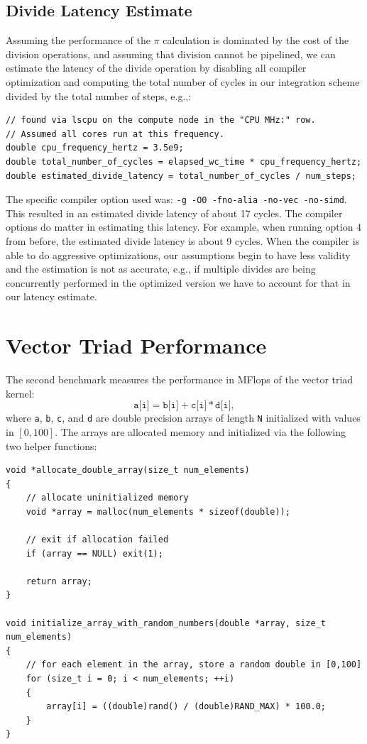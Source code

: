 \documentclass{article}
\begin{document}
\subsection*{Divide Latency Estimate}
Assuming the performance of the $\pi$ calculation is dominated by the cost of the division operations, 
and assuming that division cannot be pipelined, we can estimate the latency of the divide operation by disabling 
all compiler optimization and computing the total number of cycles in our integration scheme divided by the total number of 
steps, e.g.,: 
\begin{lstlisting}
// found via lscpu on the compute node in the "CPU MHz:" row. 
// Assumed all cores run at this frequency.
double cpu_frequency_hertz = 3.5e9;
double total_number_of_cycles = elapsed_wc_time * cpu_frequency_hertz;
double estimated_divide_latency = total_number_of_cycles / num_steps;
\end{lstlisting}
The specific compiler option used was: \texttt{-g -O0 -fno-alia -no-vec -no-simd}. This 
resulted in an estimated divide latency of about 17 cycles. The compiler options do matter in estimating this latency. 
For example, when running option 4 from before, the estimated divide latency is about 9 cycles. When the compiler 
is able to do aggressive optimizations, our assumptions begin to have less validity and the estimation is not as accurate, e.g., 
if multiple divides are being concurrently performed in the optimized version we have to account for that in our latency estimate.


\section{Vector Triad Performance}
The second benchmark measures the performance in MFlops of the vector triad kernel: 
$$
\texttt{a[i]} = \texttt{b[i]} + \texttt{c[i]} * \texttt{d[i]},
$$
where \texttt{a}, \texttt{b}, \texttt{c}, and \texttt{d} are double precision arrays 
of length \texttt{N} initialized with values in $[0, 100]$. The arrays are allocated memory and initialized via the following two helper functions:
\begin{lstlisting}
void *allocate_double_array(size_t num_elements)
{
    // allocate uninitialized memory
    void *array = malloc(num_elements * sizeof(double));

    // exit if allocation failed
    if (array == NULL) exit(1);

    return array;
}

void initialize_array_with_random_numbers(double *array, size_t num_elements)
{
    // for each element in the array, store a random double in [0,100]
    for (size_t i = 0; i < num_elements; ++i)
    {
        array[i] = ((double)rand() / (double)RAND_MAX) * 100.0;
    }
}
\end{lstlisting}
\end{document}
